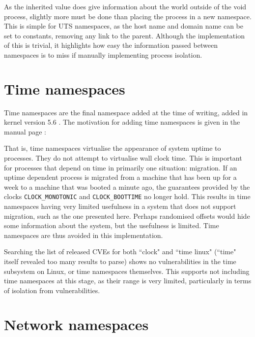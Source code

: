 \documentclass[12pt,a4paper,twoside]{report}
\begin{document}
As the inherited value does give information about the world outside of the void process, slightly more must be done than placing the process in a new namespace. This is simple for UTS namespaces, as the host name and domain name can be set to constants, removing any link to the parent. Although the implementation of this is trivial, it highlights how easy the information passed between namespaces is to miss if manually implementing process isolation.

\section{Time namespaces}
\label{sec:voiding-time}

Time namespaces are the final namespace added at the time of writing, added in kernel version 5.6 \citep{linux_kernel_newbies_editors_linux_2020}. The motivation for adding time namespaces is given in the manual page \citep{free_software_foundation_time_namespaces7_2021}:


That is, time namespaces virtualise the appearance of system uptime to processes. They do not attempt to virtualise wall clock time. This is important for processes that depend on time in primarily one situation: migration. If an uptime dependent process is migrated from a machine that has been up for a week to a machine that was booted a minute ago, the guarantees provided by the clocks \texttt{CLOCK\_MONOTONIC} and \texttt{CLOCK\_BOOTTIME} no longer hold. This results in time namespaces having very limited usefulness in a system that does not support migration, such as the one presented here. Perhaps randomised offsets would hide some information about the system, but the usefulness is limited. Time namespaces are thus avoided in this implementation.

Searching the list of released CVEs for both ``clock" and ``time linux" (``time" itself revealed too many results to parse) shows no vulnerabilities in the time subsystem on Linux, or time namespaces themselves. This supports not including time namespaces at this stage, as their range is very limited, particularly in terms of isolation from vulnerabilities.

\section{Network namespaces}
\label{sec:voiding-net}
\end{document}
